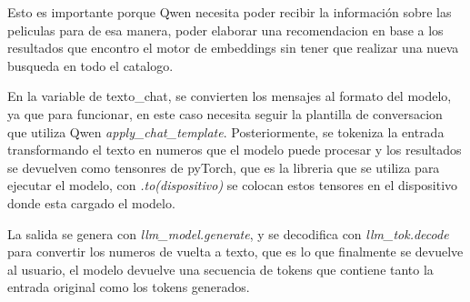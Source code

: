 Esto es importante porque Qwen necesita poder recibir la información sobre las peliculas para de esa manera, poder elaborar una recomendacion en base a los resultados que encontro el motor de embeddings sin tener que realizar una nueva busqueda en todo el catalogo.

En la variable de texto\_chat, se convierten los mensajes al formato del modelo, ya que para funcionar, en este caso necesita seguir la plantilla de conversacion que utiliza Qwen \textit{apply\_chat\_template}. Posteriormente, se tokeniza la entrada transformando el texto en numeros que el modelo puede procesar y los resultados se devuelven como tensonres de pyTorch, que es la libreria que se utiliza para ejecutar el modelo, con \textit{.to(dispositivo)} se colocan estos tensores en el dispositivo donde esta cargado el modelo.

La salida se genera con \textit{llm\_model.generate}, y se decodifica con \textit{llm\_tok.decode} para convertir los numeros de vuelta a texto, que es lo que finalmente se devuelve al usuario, el modelo devuelve una secuencia de tokens que contiene tanto la entrada original como los tokens generados.

